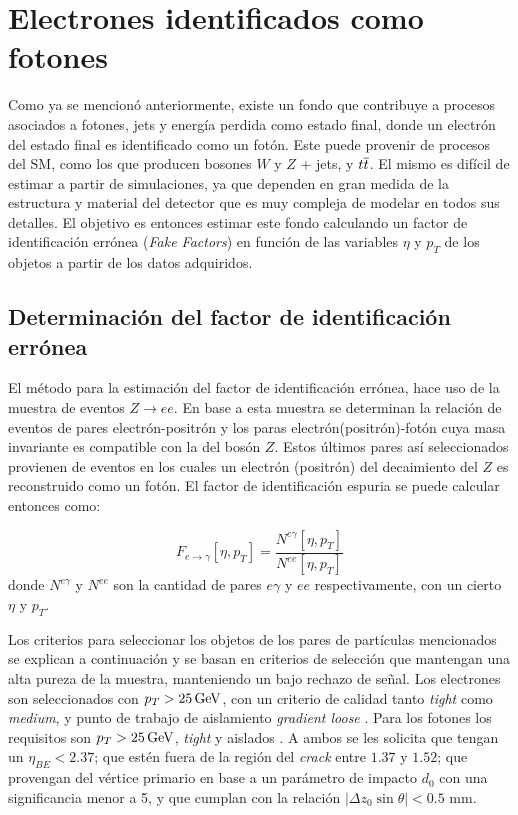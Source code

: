 \chapter{Electrones identificados como fotones}\label{ch:e_fake}


Como ya se mencionó anteriormente, existe un fondo que contribuye a procesos asociados a fotones, jets y energía perdida como estado final, donde un electrón del estado final es identificado como un fotón. Este puede provenir de procesos del SM, como los que producen bosones $W$ y $Z$ + jets, y $t \overline{t}$. El mismo es difícil de estimar a partir de simulaciones, ya que dependen en gran medida de la estructura y material del detector que es muy compleja de modelar en todos sus detalles. El objetivo es entonces estimar este fondo calculando un factor de identificación errónea (\textit{Fake Factors}) en función de las variables $\eta$ y $p_{T}$ de los objetos a partir de los datos adquiridos.

\section{Determinación del factor de identificación errónea}

El método para la estimación del factor de identificación errónea, hace uso de la muestra de eventos $Z\rightarrow ee$. En base a esta muestra se determinan la relación de eventos de pares electrón-positrón y los paras electrón(positrón)-fotón cuya masa invariante es compatible con la del bosón $Z$. Estos últimos pares así seleccionados provienen de eventos en los cuales un electrón (positrón) del decaimiento del $Z$ es reconstruido como un fotón. El factor de identificación espuria se puede calcular entonces como: 

\begin{equation}
F_{e\rightarrow\gamma}[\eta , p_{T}]=\frac{N^{e\gamma}[\eta , p_{T}]}{N^{ee}[\eta , p_{T}]} \label{eq:ff_ratio}
\end{equation}
%
donde $N^{e\gamma}$ y $N^{ee}$ son la cantidad de pares $e\gamma$ y $ee$ respectivamente, con un cierto $\eta$ y $p_{T}$.

Los criterios para seleccionar los objetos de los pares de partículas mencionados se explican a continuación y se basan en criterios de selección que mantengan una alta pureza de la muestra, manteniendo un bajo rechazo de señal.
Los electrones  son seleccionados con $p_{T} > 25 \, \mathrm{GeV}$, con un criterio de calidad tanto \textit{tight} como \textit{medium}, y punto de trabajo de aislamiento \textit{gradient loose} \cite{ATLAS-CONF-2016-024}. Para los fotones los requisitos son $p_{T} > 25 \, \mathrm{GeV}$, \textit{tight} y aislados \cite{STDM-2010-08}. A ambos se les solicita que tengan un $\eta_{BE}<2.37$; que estén fuera de la región del \textit{crack} entre $1.37$ y $1.52$; que provengan del vértice primario en base a un parámetro de impacto $d_{0}$ con una significancia menor a 5, y que cumplan con la relación $|\Delta z_{0}\sin\theta|<0.5$ mm.

